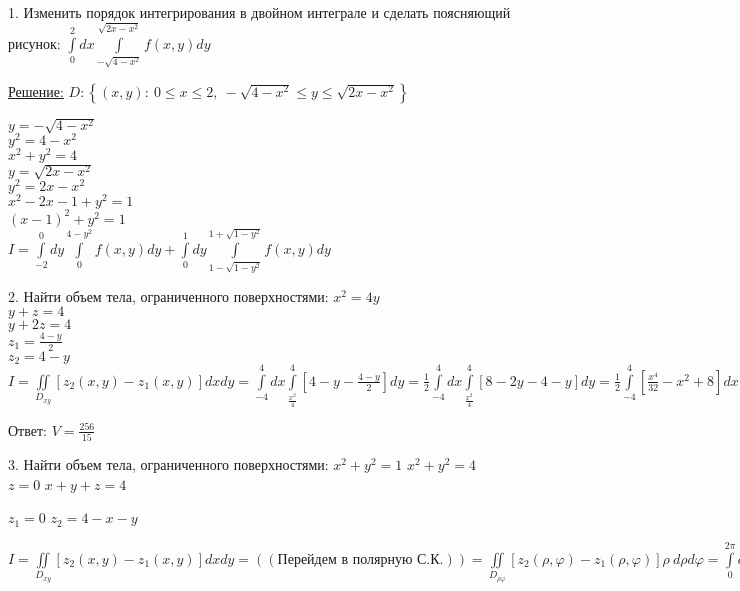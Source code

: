 \documentclass[a4paper]{article}
\begin{document}
1. Изменить порядок интегрирования в двойном интеграле и сделать поясняющий рисунок:
$\int\limits_{0}^{2} dx \int\limits_{-\sqrt{4 - x^2}}^{\sqrt{2x-x^2}} f(x,y) dy$

\underline{Решение:}
$D : \left\{ (x,y): \ 0 \leqslant x \leqslant 2, \ -\sqrt{4 - x^2} \leqslant y \leqslant \sqrt{2x - x^2} \right\}$

$y = -\sqrt{4 - x^2}$ \\
$y^2 = 4 - x^2$ \\
$x^2 + y^2 = 4$ \\

$y = \sqrt{2x - x^2}$ \\
$y^2 = 2x - x^2$ \\ 
$x^2 - 2x - 1 + y^2 = 1$ \\ 
$(x-1)^2 + y^2 = 1$ \\

$I = \int\limits_{-2}^{0} dy \int\limits_{0}^{4 - y^2} f(x,y) dy + \int\limits_{0}^{1} dy \int\limits_{1 - \sqrt{1 - y^2}}^{1 + \sqrt{1 - y^2}} f(x,y) dy$


2. Найти объем тела, ограниченного поверхностями:
$x^2 = 4y$ \\
$y + z = 4$ \\
$y + 2z = 4$ \\

$z_1 = \frac{4 - y}{2}$ \\
$z_2 = 4 - y$ \\ 

$ I = 
\iint\limits_{D_{xy}} \left[ z_2(x,y) - z_1(x,y) \right] dxdy = 
\int\limits_{-4}^{4} dx \int\limits_{\frac{x^2}{4}}^{4} \left[4 - y - \frac{4 - y}{2} \right] dy =
\frac{1}{2} \int\limits_{-4}^{4} dx \int\limits_{\frac{x^2}{4}}^{4} \left[ 8 - 2y - 4 - y \right] dy = 
\frac{1}{2} \int\limits_{-4}^{4} \left[ \frac{x^4}{32} - x^2 + 8 \right] dx = 
\frac{1}{2} \left[ \frac{x^5}{160} - \frac{x^3}{3} + 8x \right] \bigg|_{-4}^{4} = 
\frac{1}{2} \left( \frac{2048}{160} - \frac{128}{3} + 664 \right) = 
\frac{1}{2} \left( \frac{64}{5} - \frac{128}{3} + 64\right) = 
\frac{256}{15}$

Ответ: $V = \frac{256}{15}$
 

3. Найти объем тела, ограниченного поверхностями:
$x^2 + y^2 = 1$
$x^2 + y^2 = 4$
$z = 0$
$x + y + z = 4$ 

$z_1 = 0$ 
$z_2 = 4 - x - y$

$I = \iint\limits_{D_{xy}} \left[ z_2(x,y) - z_1(x,y) \right] dxdy = 
((\text{Перейдем в полярную С.К.})) = 
\iint\limits_{D_{\rho \varphi}} \left[z_2(\rho, \varphi) - z_1(\rho, \varphi)\right] \rho \ d\rho d\varphi = 
\int\limits_{0}^{2 \pi} d\varphi \int\limits_{1}^{2} 4\rho \ d\rho - 
\int\limits_{0}^{2 \pi} d\varphi \int\limits_{1}^{2} \rho^2 \cos{\varphi} d\rho - 
\int\limits_{0}^{2 \pi} d\varphi \int\limits_{1}^{2} \rho^2 \sin{\varphi} d\varphi = 
2 \pi \cdot 4 \cdot \frac{\rho^2}{2} \bigg|_{1}^{2} - 
\frac{7}{3} \int\limits_{0}^{2 \pi} \cos{\varphi} d\varphi - 
\frac{7}{3} \int\limits_{0}^{2 \pi} \sin{\varphi} d\varphi = 
12 \pi - 
\frac{7}{3} \cdot \sin{\varphi} \bigg|_{0}^{2 \pi} + 
\frac{7}{3} \cos{\varphi} \bigg|_{0}^{2 \pi} = 
12 \pi.$
\end{document}
